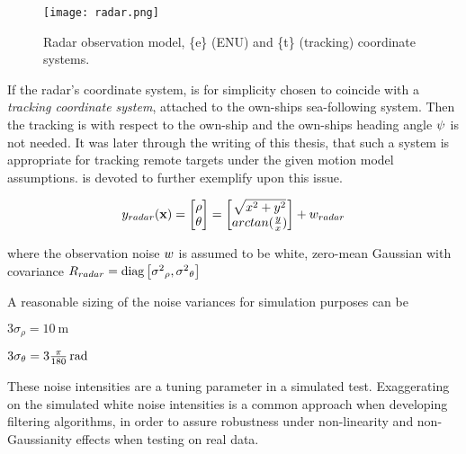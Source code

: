 \begin{figure}[H]
	\centering
	\texttt{[image: radar.png]}
	\caption{Radar observation model, \{e\} (ENU) and \{t\} (tracking) coordinate systems.}
	\label{fig:radar_observation_model}
\end{figure}


If the radar's coordinate system, is for simplicity  chosen to coincide with a \emph{tracking coordinate system},  attached to the own-ships sea-following system. Then the tracking is with respect to the own-ship and the own-ships heading angle ${\psi}$ is not needed. It was later through the writing of this thesis, that such a system is appropriate for tracking remote targets under the given motion model assumptions.  is devoted to further exemplify upon this issue.


\begin{equation}
{{y}}_{radar}(\mathbf{x}) = \begin{bmatrix}
\rho \\
\theta
\end{bmatrix} = \begin{bmatrix}
\sqrt{x^2 + y^2} \\
arctan(\frac{y}{x})
\end{bmatrix} + {w}_{radar}
\end{equation}


where the observation noise ${w}$ is assumed to be white, zero-mean Gaussian with covariance ${R}_{radar} = \text{diag}\left[{\sigma^2}_{\rho}, {\sigma^2}_{\theta}\right] $



A reasonable sizing of the noise variances for simulation purposes can be
\begin{description}
	\item $3\sigma_\rho = \SI{10}{\meter}$
	\item $3\sigma_\theta = \SI[parse-numbers=false]{3\frac{\pi}{180}}{\radian}  $
\end{description}

These noise intensities are a tuning parameter in a simulated test. Exaggerating on the simulated white noise intensities is a common approach when developing filtering algorithms, in order to assure robustness under non-linearity and non-Gaussianity effects when testing on real data.

